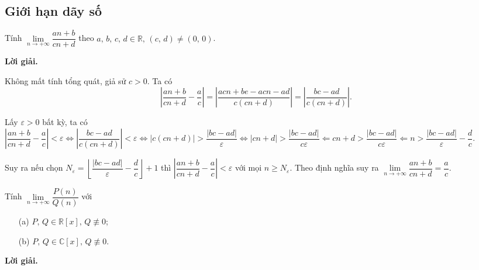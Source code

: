 \subsection{Giới hạn dãy số}

\begin{tcolorbox}[breakable]
    \begin{baitoan}
        Tính $\lim\limits_{n\to+\infty} \dfrac{an + b}{cn + d}$ theo $a,\,b,\,c,\,d \in \mathbb{R},\, (c,\,d) \ne (0,\,0)$.
    \end{baitoan}
\end{tcolorbox}

\textbf{Lời giải. }

Không mất tính tổng quát, giả sử $c > 0$. Ta có $$\left|\dfrac{an+b}{cn+d} - \dfrac{a}{c}\right|  = \left|\dfrac{acn + be - acn - ad}{c(cn+d)}\right| = \left|\dfrac{bc-ad}{c(cn+d)}\right|.$$ 

Lấy $\varepsilon > 0$ bất kỳ, ta có $\left|\dfrac{an+b}{cn+d} - \dfrac{a}{c}\right| < \varepsilon \iff \left|\dfrac{bc-ad}{c(cn+d)}\right| < \varepsilon \iff \left|c(cn+d)\right| > \dfrac{\left|bc-ad\right|}{\varepsilon} \iff \left|cn+d\right| > \dfrac{\left|bc-ad\right|}{c\varepsilon} \Longleftarrow cn + d > \dfrac{\left|bc-ad\right|}{c\varepsilon} \Longleftarrow n > \dfrac{\left|bc-ad\right|}{\varepsilon} - \dfrac{d}{c}$.

Suy ra nếu chọn $N_\varepsilon = \left\lfloor\dfrac{\left|bc-ad\right|}{\varepsilon} - \dfrac{d}{c}\right\rfloor+1$ thì $\left|\dfrac{an+b}{cn+d} - \dfrac{a}{c}\right| < \varepsilon$ với mọi $n \geq N_\varepsilon$. Theo định nghĩa suy ra $\lim\limits_{n\to+\infty} \dfrac{an + b}{cn + d} = \dfrac{a}{c}$.




\begin{tcolorbox}[breakable]
    \begin{baitoan}
        Tính $\lim\limits_{n\to+\infty} \dfrac{P(n)}{Q(n)}$ với 
        \begin{enumerate}
            \item[(a)] $P,\,Q \in \mathbb{R}[x],\,Q \not\equiv 0$;
            \item[(b)]$P,\,Q \in \mathbb{C}[x],\,Q \not\equiv 0$.
        \end{enumerate}
    \end{baitoan}
\end{tcolorbox}

\textbf{Lời giải. }